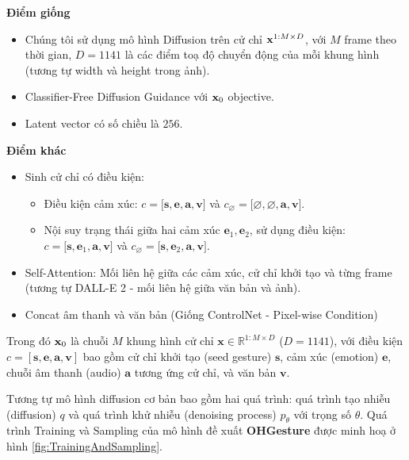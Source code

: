 \vspace{10pt}

\textbf{Điểm giống}
\begin{itemize}
	\item Chúng tôi sử dụng mô hình Diffusion \cite{yang2023diffusestylegesture} trên cử chỉ $\mathbf{x}^{1:M \times D}$,  với $M$ frame theo thời gian, $D=1141$ là các điểm toạ độ chuyển động của mỗi khung hình (tương tự width và height trong ảnh).
	\item Classifier-Free Diffusion Guidance với $\mathbf{x}_0$ objective.
	\item Latent vector có số chiều là $256$.
\end{itemize}

\textbf{Điểm khác}

\begin{itemize}
	\item Sinh cử chỉ có điều kiện:
	\begin{itemize}
		\item Điều kiện cảm xúc: $c = \big[ \mathbf{s}, \mathbf{e}, \mathbf{a}, \mathbf{v} \big]$ và $c_{\varnothing} = \big[ \varnothing, \varnothing, \mathbf{a}, \mathbf{v}\big]$.
		\item Nội suy trạng thái giữa hai cảm xúc $\mathbf{e}_1, \mathbf{e}_2$, sử dụng điều kiện: $c = \big[ \mathbf{s}, \mathbf{e}_1, \mathbf{a}, \mathbf{v} \big]$ và $c_{\varnothing} = \big[ \mathbf{s}, \mathbf{e}_2, \mathbf{a}, \mathbf{v} \big]$.
	\end{itemize}
	\item Self-Attention: Mối liên hệ giữa các cảm xúc, cử chỉ khởi tạo và từng frame (tương tự DALL-E 2 - mối liên hệ giữa văn bản và ảnh).
	\item Concat âm thanh và văn bản (Giống ControlNet - Pixel-wise Condition)
\end{itemize}

Trong đó $\mathbf{x}_0$ là chuỗi $M$ khung hình cử chỉ $\mathbf{x} \in \mathbb{R}^{1:M \times D}$ ($D = 1141$), với điều kiện $c = [\mathbf{s}, \mathbf{e}, \mathbf{a}, \mathbf{v}]$ bao gồm cử chỉ khởi tạo (seed gesture) $\mathbf{s}$,  cảm xúc (emotion) $\mathbf{e}$, chuỗi âm thanh (audio) $\mathbf{a}$ tương ứng cử chỉ, và văn bản  $\mathbf{v}$.

Tương tự mô hình diffusion cơ bản bao gồm hai quá trình: quá trình tạo nhiễu (diffusion) $q$ và quá trình khử nhiễu (denoising process) $p_{\theta}$ với trọng số $\theta$. Quá trình Training và Sampling của mô hình đề xuất \textbf{OHGesture} được minh hoạ ở hình \ref{fig:TrainingAndSampling}.


